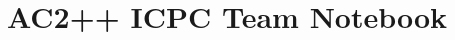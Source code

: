 \documentclass[14pt,spanish]{article}
\title{\vspace{-4ex}\Large{AC2++ ICPC Team Notebook}}
\author{}
\date{}
\begin{document}
\maketitle
\vspace{-13ex}
\tableofcontents
\newpage
\pagestyle{fancy}

\begin{landscape}
\begin{multicols}{2}


\end{multicols}
\end{landscape}
\end{document}
